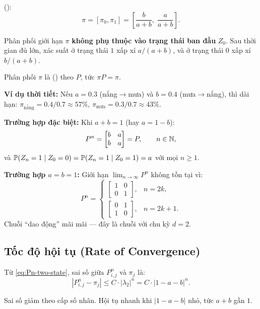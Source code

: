  ():
\begin{equation}\label{eq:pi-two-state}
  \pi = [\pi_0, \pi_1] = \left[\frac{b}{a+b},\; \frac{a}{a+b}\right].
\end{equation}

\begin{tomtat}
Phân phối giới hạn $\pi$ \textbf{không phụ thuộc vào trạng thái ban đầu} $Z_0$.
Sau thời gian đủ lớn, xác suất ở trạng thái $1$ xấp xỉ $a/(a+b)$,
và ở trạng thái $0$ xấp xỉ $b/(a+b)$.

Phân phối $\pi$ là  () theo $P$, tức $\pi P = \pi$.

\textbf{Ví dụ thời tiết:} Nếu $a = 0.3$ (nắng$\to$mưa) và $b = 0.4$ (mưa$\to$nắng),
thì dài hạn: $\pi_{\text{nắng}} = 0.4/0.7 \approx 57\%$, $\pi_{\text{mưa}} = 0.3/0.7 \approx 43\%$.
\end{tomtat}

\textbf{Trường hợp đặc biệt:} Khi $a + b = 1$ (hay $a = 1-b$):
\[
  P^n = \begin{bmatrix} b & a \\ b & a \end{bmatrix} = P, \qquad n \in \mathbb{N},
\]
và $\mathbb{P}(Z_n = 1 \mid Z_0 = 0) = \mathbb{P}(Z_n = 1 \mid Z_0 = 1) = a$ với mọi $n \geq 1$.

\textbf{Trường hợp $a = b = 1$:} Giới hạn $\lim_{n\to\infty} P^n$ không tồn tại vì:
\[
  P^n = \begin{cases}
    \begin{bmatrix} 1 & 0 \\ 0 & 1 \end{bmatrix}, & n = 2k, \\[6pt]
    \begin{bmatrix} 0 & 1 \\ 1 & 0 \end{bmatrix}, & n = 2k+1.
  \end{cases}
\]
Chuỗi ``dao động'' mãi mãi --- đây là chuỗi  với chu kỳ $d = 2$.

\subsection{Tốc độ hội tụ (Rate of Convergence)}

Từ \eqref{eq:Pn-two-state}, sai số giữa $P^n_{i,j}$ và $\pi_j$ là:
\[
  |P^n_{i,j} - \pi_j| \leq C \cdot |\lambda_2|^n = C \cdot |1 - a - b|^n.
\]

Sai số giảm theo cấp số nhân. Hội tụ nhanh khi $|1-a-b|$ nhỏ, tức $a + b$ gần $1$.

